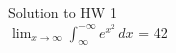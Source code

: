 \documentclass{article}
\begin{document}
    \begin{center}
        Solution to HW 1\\
        $\lim_{x \to \infty} \int_{\infty}^{-\infty} e^{x^2} \,dx$ = 42
    \end{center}
\end{document}
